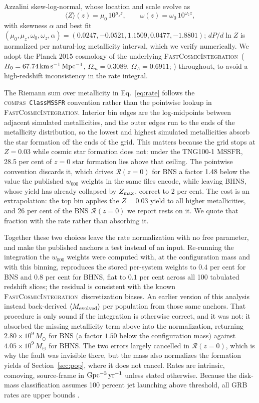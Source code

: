 \documentclass[twocolumn,apj]{openjournal}
\newcommand{\Msun}{M_\odot}
\newcommand{\compas}{\textsc{compas}}
\newcommand{\fci}{\textsc{FastCosmicIntegration}}
\newcommand{\Rzero}{\mathcal{R}(z{=}0)}
\newcommand{\Gpcyr}{{\rm Gpc^{-3}\,yr^{-1}}}
\begin{document}
\citet{levina2026} Azzalini skew-log-normal, whose location and scale evolve as
\begin{equation}
\langle Z\rangle(z) = \mu_0\,10^{\mu_z z}, \qquad \omega(z) = \omega_0\,10^{\omega_z z},
\label{eq:mssfr}
\end{equation}
with skewness $\alpha$ and best fit $(\mu_0, \mu_z, \omega_0, \omega_z, \alpha) =
(0.0247, -0.0521, 1.1509, 0.0477, -1.8801)$; $dP/d\ln Z$ is normalized per
natural-log metallicity interval, which we verify numerically. We adopt the
Planck 2015 cosmology of the underlying \fci\
($H_0 = 67.74\,{\rm km\,s^{-1}\,Mpc^{-1}}$, $\Omega_m = 0.3089$,
$\Omega_\Lambda = 0.6911$; \citealt{planck2016}) throughout, to avoid a
high-redshift inconsistency in the rate integral.

The Riemann sum over metallicity in Eq.~\ref{eq:rate} follows the \compas\
\texttt{ClassMSSFR} convention rather than the pointwise lookup in \fci. Interior
bin edges are the log-midpoints between adjacent simulated metallicities, and
the outer edges run to the ends of the metallicity distribution, so the lowest
and highest simulated metallicities absorb the star formation off the ends of
the grid. This matters because the grid stops at $Z = 0.03$ while cosmic star
formation does not: under the \citet{levina2026} TNG100-1 MSSFR, 28.5 per cent
of $z = 0$ star formation lies above that ceiling. The pointwise convention
discards it, which drives $\Rzero$ for BNS a factor 1.48 below the value the
published $w_{000}$ weights in the same files encode, while leaving BHNS, whose
yield has already collapsed by $Z_{\rm max}$, correct to 2 per cent. The cost is
an extrapolation: the top bin applies the $Z = 0.03$ yield to all higher
metallicities, and 26 per cent of the BNS $\Rzero$ we report rests on it. We
quote that fraction with the rate rather than absorbing it.

Together these two choices leave the rate normalization with no free parameter,
and make the published anchors a test instead of an input. Re-running the
\citet{neijssel2019} integration the $w_{000}$ weights were computed with, at
the configuration mass and with this binning, reproduces the stored per-system
weights to $0.4$ per cent for BNS and $0.8$ per cent for BHNS, flat to $0.1$ per
cent across all 100 tabulated redshift slices; the residual is consistent with
the known \fci\ discretization biases. An earlier version of this analysis
instead back-derived $\langle M_{\rm evolved}\rangle$ per population from those
same anchors. That procedure is only sound if the integration is otherwise
correct, and it was not: it absorbed the missing metallicity term above into the
normalization, returning $2.80\times10^{9}\,\Msun$ for BNS (a factor $1.50$
below the configuration mass) against $4.05\times10^{9}\,\Msun$ for BHNS. The
two errors largely cancelled in $\Rzero$, which is why the fault was invisible
there, but the mass also normalizes the formation yields of
Section~\ref{sec:pop}, where it does not cancel. Rates are intrinsic,
comoving, source-frame in $\Gpcyr$ unless stated otherwise. Because the disk-mass
classification assumes 100 percent jet launching above threshold, all GRB rates
are upper bounds \citep{gottlieb2023}.
\end{document}
